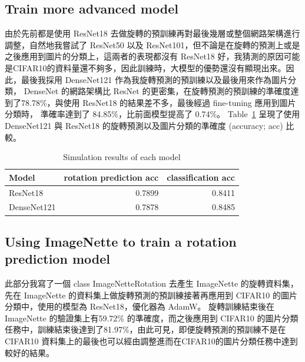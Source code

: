 \documentclass[a4paper,12pt]{article}   %
\begin{document}
\subsection{Train more advanced model}
	由於先前都是使用 ResNet18 去做旋轉的預訓練再對最後幾層或整個網路架構進行調整，自然地我嘗試了 ResNet50 以及 ResNet101，但不論是在旋轉的預測上或是之後應用到圖片的分類上，這兩者的表現都沒有 ResNet18 好，我猜測的原因可能是CIFAR10的資料量還不夠多，因此訓練時，大模型的優勢還沒有顯現出來。因此，最後我採用 DenseNet121 作為我旋轉預測的預訓練以及最後用來作為圖片分類， DenseNet 的網路架構比 ResNet 的更密集，在旋轉預測的預訓練的準確度達到了78.78\%，與使用 ResNet18 的結果差不多，最後經過 fine-tuning 應用到圖片分類時， 準確率達到了 84.85\%，比前面模型提高了 0.74\%。 Table\ \ref{table:comparison3} 呈現了使用 DenseNet121 與 ResNet18 的旋轉預測以及圖片分類的準確度 (accuracy; acc) 比較。 
	
\begin{table}[htb]
	\centering	
	\normalsize
    \newcommand{\z}{\phantom{0}}
    \caption{Simulation results of each model}
    \vspace{0.15\baselineskip}
	\begin{tabularx}{0.8\textwidth}{@{}lrr@{}}\toprule
		\textbf{Model} & \textbf{rotation prediction acc} & \textbf{classification acc} \\
		\hline
		ResNet18      & 0.7899 & 0.8411 \\ 
		DenseNet121   & 0.7878 & 0.8485 \\
    		\hline
	\end{tabularx}
	\label{table:comparison3}
   \vspace{0.15\baselineskip}
\end{table}


\subsection{Using ImageNette to train a rotation prediction model}

	此部分我寫了一個 class ImageNetteRotation 去產生 ImageNette 的旋轉資料集，先在 ImageNette 的資料集上做旋轉預測的預訓練接著再應用到 CIFAR10 的圖片分類中，使用的模型為 ResNet18，優化器為 AdamW。 旋轉訓練結束後在 ImageNette 的驗證集上有59.72\% 的準確度，而之後應用到 CIFAR10 的圖片分類任務中，訓練結束後達到了81.97\%，由此可見，即便旋轉預測的預訓練不是在 CIFAR10 資料集上的最後也可以經由調整進而在CIFAR10的圖片分類任務中達到較好的結果。





 

\end{document}
